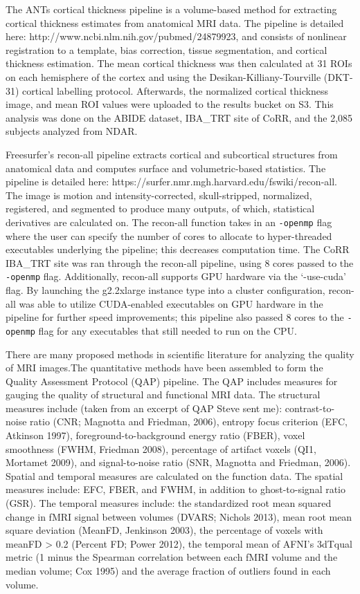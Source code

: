 \documentclass{frontiersSCNS} %
\begin{document}
The ANTs cortical thickness pipeline is a volume-based method for extracting cortical thickness estimates from anatomical MRI data. The pipeline is detailed here: http://www.ncbi.nlm.nih.gov/pubmed/24879923, and consists of nonlinear registration to a template, bias correction, tissue segmentation, and cortical thickness estimation. The mean cortical thickness was then calculated at 31 ROIs on each hemisphere of the cortex and using the Desikan-Killiany-Tourville (DKT-31) cortical labelling protocol. Afterwards, the normalized cortical thickness image, and mean ROI values were uploaded to the results bucket on S3. This analysis was done on the ABIDE dataset, IBA\_TRT site of CoRR, and the 2,085 subjects analyzed from NDAR.


Freesurfer's recon-all pipeline extracts cortical and subcortical structures from anatomical data and computes surface and volumetric-based statistics. The pipeline is detailed here: https://surfer.nmr.mgh.harvard.edu/fswiki/recon-all. The image is motion and intensity-corrected, skull-stripped, normalized, registered, and segmented to produce many outputs, of which, statistical derivatives are calculated on. The recon-all function takes in an \texttt{-openmp} flag where the user can specify the number of cores to allocate to hyper-threaded executables underlying the pipeline; this decreases computation time. The CoRR IBA\_TRT site was ran through the recon-all pipeline, using 8 cores passed to the \texttt{-openmp} flag. Additionally, recon-all supports GPU hardware via the ‘-use-cuda’ flag. By launching the g2.2xlarge instance type into a cluster configuration, recon-all was able to utilize CUDA-enabled executables on GPU hardware in the pipeline for further speed improvements; this pipeline also passed 8 cores to the \texttt{-openmp} flag for any executables that still needed to run on the CPU.


There are many proposed methods in scientific literature for analyzing the quality of MRI images.The quantitative methods have been assembled to form the Quality Assessment Protocol (QAP) pipeline. The QAP includes measures for gauging the quality of structural and functional MRI data. The structural measures include (taken from an excerpt of QAP Steve sent me): contrast-to-noise ratio (CNR; Magnotta and Friedman, 2006), entropy focus criterion (EFC, Atkinson 1997), foreground-to-background energy ratio (FBER), voxel smoothness (FWHM, Friedman 2008), percentage of artifact voxels (QI1, Mortamet 2009), and signal-to-noise ratio (SNR, Magnotta and Friedman, 2006). Spatial and temporal measures are calculated on the function data. The spatial measures include: EFC, FBER, and FWHM, in addition to ghost-to-signal ratio (GSR). The temporal measures include: the standardized root mean squared change in fMRI signal between volumes (DVARS; Nichols 2013), mean root mean square deviation (MeanFD, Jenkinson 2003), the percentage of voxels with meanFD > 0.2 (Percent FD; Power 2012), the temporal mean of AFNI’s 3dTqual metric (1 minus the Spearman correlation between each fMRI volume and the median volume; Cox 1995) and the average fraction of outliers found in each volume.
\end{document}
